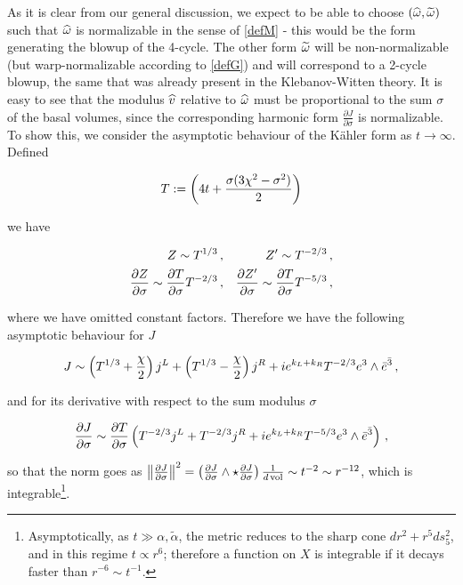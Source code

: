 As it is clear from our general discussion, we expect to be able to choose $(\widehat{\omega},\widetilde{\omega})$ such that $\widehat{\omega}$ is normalizable in the sense of \eqref{defM} - this would be the form generating the blowup of the 4-cycle. The other form $\widetilde{\omega}$ will be non-normalizable (but warp-normalizable according to \eqref{defG}) and will correspond to a 2-cycle blowup, the same that was already present in the Klebanov-Witten theory. It is easy to see that the modulus $\widehat{v}$ relative to $\widehat{\omega}$ must be proportional to the sum $\sigma$ of the basal volumes, since the corresponding harmonic form $\frac{\partial J}{\partial \sigma}$ is normalizable. To show this, we consider the asymptotic behaviour of the K\"ahler form as $t\rightarrow \infty$. Defined

\begin{equation}
	T := \left( 4t + \frac{\sigma(3\chi^2 - \sigma^2)}{2} \right)
	\label{}
\end{equation}

we have

\begin{align}
	Z \sim T^{1/3}\,, && Z' \sim T^{-2/3}\,,\\	
	\frac{\partial Z}{\partial \sigma} \sim \frac{\partial T}{\partial \sigma} T^{-2/3}\,, && \frac{\partial Z'}{\partial \sigma} \sim \frac{\partial T}{\partial \sigma} T^{-5/3}\,,
\end{align}

where we have omitted constant factors. Therefore we have the following asymptotic behaviour for $J$

\begin{equation}
	J \sim \left(T^{1/3} + \frac{\chi}{2}\right) j^L + \left(T^{1/3} - \frac{\chi}{2}\right)j^R + ie^{k_L + k_R} T^{-2/3} e^3 \wedge \bar e^{\bar 3}\,,
	\label{}
\end{equation}

and for its derivative with respect to the sum modulus $\sigma$

\begin{equation}
	\frac{\partial J}{\partial \sigma} \sim \frac{\partial T}{\partial \sigma}\left( T^{-2/3} j^L + T^{-2/3} j^R + i e^{k_L + k_R} T^{-5/3}e^3 \wedge \bar e^{\bar 3} \right)\,,
	\label{}
\end{equation}


so that the norm goes as $\left\Vert \frac{\partial J}{\partial\sigma} \right\Vert^2 = \left(\frac{\partial J}{\partial\sigma} \wedge \star \frac{\partial J}{\partial\sigma}\right) \frac{1}{d\operatorname{vol}} \sim t^{-2} \sim r^{-12}$, which is integrable\footnote{Asymptotically, as $t\gg \alpha,\tilde{\alpha}$, the metric reduces to the sharp cone $dr^2 + r^5 ds_5^2$, and in this regime $t \propto r^6$; therefore a function on $X$ is integrable if it decays faster than $r^{-6} \sim t^{-1}$.}.

